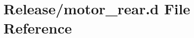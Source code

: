 \hypertarget{motor__rear_8d}{}\section{Release/motor\+\_\+rear.d File Reference}
\label{motor__rear_8d}
